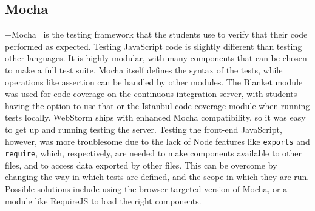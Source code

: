 \documentclass[12pt]{article}
\newcommand{\code}[1]{{\texttt {#1}}}
\begin{document}
\subsection{Mocha}\label{sec:mocha}
+Mocha~\cite{Mocha} is the testing framework that the students use to verify that their code performed as expected. Testing JavaScript code is slightly different than testing other languages. It is highly modular, with many components that can be chosen to make a full test suite. Mocha itself defines the syntax of the tests, while operations like assertion can be handled by other modules. The Blanket module was used for code coverage on the continuous integration server, with students having the option to use that or the Istanbul code coverage module when running tests locally. WebStorm ships with enhanced Mocha compatibility, so it was easy to get up and running testing the server. Testing the front-end JavaScript, however, was more troublesome due to the lack of Node features like \code{exports} and \code{require}, which, respectively, are needed to make components available to other files, and to access data exported by other files. This can be overcome by changing the way in which tests are defined, and the scope in which they are run. Possible solutions include using the browser-targeted version of Mocha, or a module like RequireJS to load the right components.
\end{document}
